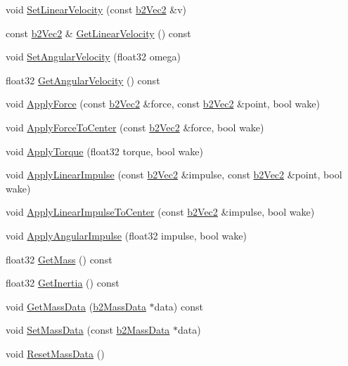 \begin{DoxyCompactItemize}
void \hyperlink{classb2Body_a832f3989a44f0d4782c80456832197ad}{Set\+Linear\+Velocity} (const \hyperlink{structb2Vec2}{b2\+Vec2} \&v)
\item 
const \hyperlink{structb2Vec2}{b2\+Vec2} \& \hyperlink{classb2Body_a0d513a5a078caa4b9e00bf8e199f29a2}{Get\+Linear\+Velocity} () const
\item 
void \hyperlink{classb2Body_a37adc4160b84f73e8552a91cbde3f578}{Set\+Angular\+Velocity} (float32 omega)
\item 
float32 \hyperlink{classb2Body_a6a404d85efc510f43575f61cb95c07a7}{Get\+Angular\+Velocity} () const
\item 
void \hyperlink{classb2Body_a942be8e1cd2bcd06f53c4638c45a9525}{Apply\+Force} (const \hyperlink{structb2Vec2}{b2\+Vec2} \&force, const \hyperlink{structb2Vec2}{b2\+Vec2} \&point, bool wake)
\item 
void \hyperlink{classb2Body_abeba04911f7a2a141169bb06fe98d06a}{Apply\+Force\+To\+Center} (const \hyperlink{structb2Vec2}{b2\+Vec2} \&force, bool wake)
\item 
void \hyperlink{classb2Body_a54a354447ac3b4cc224c8327a5abc0e8}{Apply\+Torque} (float32 torque, bool wake)
\item 
void \hyperlink{classb2Body_a7f677e93efb3c4c065087aff317274a3}{Apply\+Linear\+Impulse} (const \hyperlink{structb2Vec2}{b2\+Vec2} \&impulse, const \hyperlink{structb2Vec2}{b2\+Vec2} \&point, bool wake)
\item 
void \hyperlink{classb2Body_afa249d2fc11735985211e47c3d8e16fb}{Apply\+Linear\+Impulse\+To\+Center} (const \hyperlink{structb2Vec2}{b2\+Vec2} \&impulse, bool wake)
\item 
void \hyperlink{classb2Body_a65384cfad8db2376cdf3fab38cac06e5}{Apply\+Angular\+Impulse} (float32 impulse, bool wake)
\item 
float32 \hyperlink{classb2Body_adfeebf45965d131894f728a2f264311d}{Get\+Mass} () const
\item 
float32 \hyperlink{classb2Body_a60929c13e4b6548492dca5ec79f159db}{Get\+Inertia} () const
\item 
void \hyperlink{classb2Body_a5100927dbd39dd0addea79d5f323f3f1}{Get\+Mass\+Data} (\hyperlink{structb2MassData}{b2\+Mass\+Data} $\ast$data) const
\item 
void \hyperlink{classb2Body_a58a641fedf8a81e1e26d09ec00a22fe2}{Set\+Mass\+Data} (const \hyperlink{structb2MassData}{b2\+Mass\+Data} $\ast$data)
\item 
void \hyperlink{classb2Body_a109d8567c6ae84c61fce2919fb209c63}{Reset\+Mass\+Data} ()

\end{DoxyCompactItemize}
